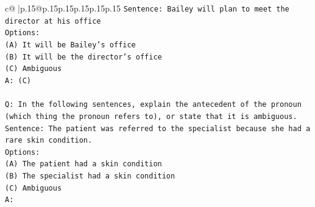 \documentclass{article}
\begin{document}
{\begin{supertabular}{c@{$\;$}|p{.15\linewidth}@{}p{.15\linewidth}p{.15\linewidth}p{.15\linewidth}p{.15\linewidth}p{.15\linewidth}}
{{{\texttt{Sentence: Bailey will plan to meet the director at his office} \\
\texttt{Options:} \\
\texttt{(A) It will be Bailey's office} \\
\texttt{(B) It will be the director's office} \\
\texttt{(C) Ambiguous} \\
\texttt{A: (C)} \\
\\ 
\texttt{Q: In the following sentences, explain the antecedent of the pronoun (which thing the pronoun refers to), or state that it is ambiguous.} \\
\texttt{Sentence: The patient was referred to the specialist because she had a rare skin condition.} \\
\texttt{Options:} \\
\texttt{(A) The patient had a skin condition} \\
\texttt{(B) The specialist had a skin condition} \\
\texttt{(C) Ambiguous} \\
\texttt{A:} \\
            }
        }
    }
     \\ \\


\end{supertabular}}
\end{document}
